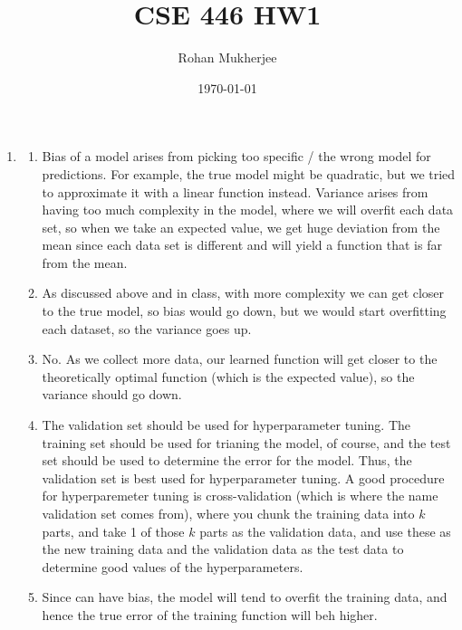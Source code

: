 \documentclass[12pt]{article}
\title{CSE 446 HW1}
\date{\today}
\author{Rohan Mukherjee}
\theoremstyle{definitionstyle}
\begin{document}
    \maketitle
    \begin{enumerate}[leftmargin=\labelsep]
        \item 
        \begin{enumerate}
            \item Bias of a model arises from picking too specific / the wrong model for predictions. For example, the true model might be quadratic, but we tried to approximate it with a linear function instead. Variance arises from having too much complexity in the model, where we will overfit each data set, so when we take an expected value, we get huge deviation from the mean since each data set is different and will yield a function that is far from the mean.
            \item As discussed above and in class, with more complexity we can get closer to the true model, so bias would go down, but we would start overfitting each dataset, so the variance goes up.
            \item No. As we collect more data, our learned function will get closer to the theoretically optimal function (which is the expected value), so the variance should go down. 
            \item The validation set should be used for hyperparameter tuning. The training set should be used for trianing the model, of course, and the test set should be used to determine the error for the model. Thus, the validation set is best used for hyperparameter tuning. A good procedure for hyperparemeter tuning is cross-validation (which is where the name validation set comes from), where you chunk the training data into $k$ parts, and take 1 of those $k$ parts as the validation data, and use these as the new training data and the validation data as the test data to determine good values of the hyperparameters.
            \item Since can have bias, the model will tend to overfit the training data, and hence the true error of the training function will beh higher.
        \end{enumerate}


\end{enumerate}
\end{document}
